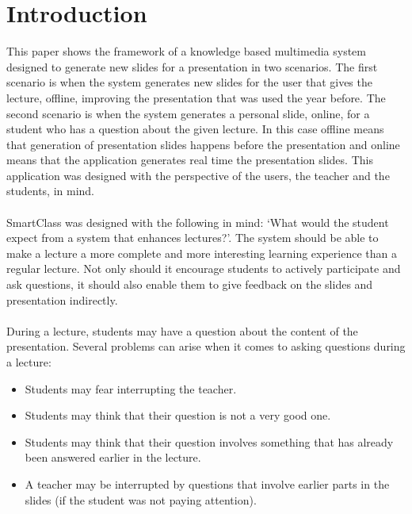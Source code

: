 \documentclass[11pt]{article}
\begin{document}
\section{Introduction}
This paper shows the framework of a knowledge based multimedia system designed to generate new slides for a presentation in two scenarios. The first scenario is when the system generates new slides for the user that gives the lecture, offline, improving the presentation that was used the year before. The second scenario is when the system generates a personal slide, online, for a student who has a question about the given lecture. In this case offline means that generation of presentation slides happens before the presentation and online means that the application generates real time the presentation slides. This application was designed with the perspective of the users, the teacher and the students, in mind.\\\\
SmartClass was designed with the following in mind: `What would the student expect from a system that enhances lectures?'. The system should be able to make a lecture a more complete and more interesting learning experience than a regular lecture. Not only should it encourage students to actively participate and ask questions, it should also enable them to give feedback on the slides and presentation indirectly. \\\\
During a lecture, students may have a question about the content of the presentation. Several problems can arise when it comes to asking questions during a lecture:
\begin{itemize}
\item Students may fear interrupting the teacher.
\item Students may think that their question is not a very good one.
\item Students may think that their question involves something that has already been answered earlier in the lecture. 
\item A teacher may be interrupted by questions that involve earlier parts in the slides (if the student was not paying attention).
\end{itemize}
\end{document}
